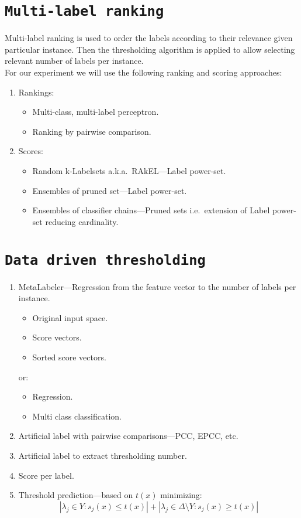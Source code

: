 \documentclass[12pt,a4paper,twocolumn]{article}
\begin{document}
\section*{\texttt{Multi-label ranking}}
Multi-label ranking is used to order the labels according to their relevance given particular instance. Then the thresholding algorithm is applied to allow selecting relevant number of labels per instance.\\
For our experiment we will use the following ranking and scoring approaches:
\begin{enumerate}
\item Rankings:
	\begin{itemize}
	\item Multi-class, multi-label perceptron.
	\item Ranking by pairwise comparison.
	\end{itemize}
\item Scores:
	\begin{itemize}
	\item Random k-Labelsets a.k.a.\ RAkEL---Label power-set.
	\item Ensembles of pruned set---Label power-set.
	\item Ensembles of classifier chains---Pruned sets i.e.\ extension of Label power-set reducing cardinality.
	\end{itemize}
\end{enumerate}

\section*{\texttt{Data driven thresholding}}
\begin{enumerate}
\item MetaLabeler---Regression from the feature vector to the number of labels per instance.
	\begin{itemize} %
	\item Original input space.
	\item Score vectors.
	\item Sorted score vectors.
	\end{itemize}

	or:

	\begin{itemize} %
	\item Regression.
	\item Multi class classification.
	\end{itemize}

\item Artificial label with pairwise comparisons---PCC, EPCC, etc.
\item Artificial label to extract thresholding number.
\item Score per label.
\item Threshold prediction---based on $t(x)$ minimizing:
	$$
	| \lambda_j \in Y : s_j(x) \leq t(x) | + | \lambda_j \in \Delta \text{\textbackslash{}} Y : s_j(x) \geq t(x) |
	$$
\end{enumerate}
\end{document}
